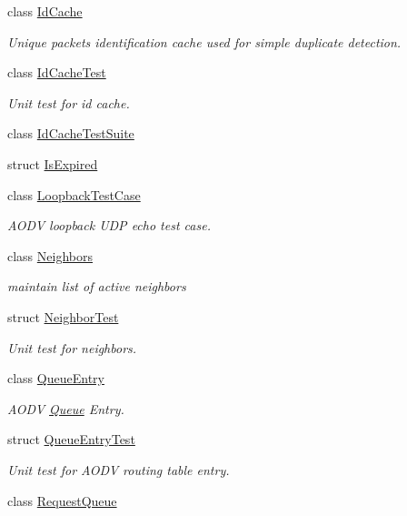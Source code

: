 \begin{DoxyCompactItemize}
class \hyperlink{classns3_1_1aodv_1_1IdCache}{Id\+Cache}
\begin{DoxyCompactList}\small\item\em Unique packets identification cache used for simple duplicate detection. \end{DoxyCompactList}\item 
class \hyperlink{classns3_1_1aodv_1_1IdCacheTest}{Id\+Cache\+Test}
\begin{DoxyCompactList}\small\item\em Unit test for id cache. \end{DoxyCompactList}\item 
class \hyperlink{classns3_1_1aodv_1_1IdCacheTestSuite}{Id\+Cache\+Test\+Suite}
\item 
struct \hyperlink{structns3_1_1aodv_1_1IsExpired}{Is\+Expired}
\item 
class \hyperlink{classns3_1_1aodv_1_1LoopbackTestCase}{Loopback\+Test\+Case}
\begin{DoxyCompactList}\small\item\em A\+O\+DV loopback U\+DP echo test case. \end{DoxyCompactList}\item 
class \hyperlink{classns3_1_1aodv_1_1Neighbors}{Neighbors}
\begin{DoxyCompactList}\small\item\em maintain list of active neighbors \end{DoxyCompactList}\item 
struct \hyperlink{structns3_1_1aodv_1_1NeighborTest}{Neighbor\+Test}
\begin{DoxyCompactList}\small\item\em Unit test for neighbors. \end{DoxyCompactList}\item 
class \hyperlink{classns3_1_1aodv_1_1QueueEntry}{Queue\+Entry}
\begin{DoxyCompactList}\small\item\em A\+O\+DV \hyperlink{classns3_1_1Queue}{Queue} Entry. \end{DoxyCompactList}\item 
struct \hyperlink{structns3_1_1aodv_1_1QueueEntryTest}{Queue\+Entry\+Test}
\begin{DoxyCompactList}\small\item\em Unit test for A\+O\+DV routing table entry. \end{DoxyCompactList}\item 
class \hyperlink{classns3_1_1aodv_1_1RequestQueue}{Request\+Queue}

\end{DoxyCompactItemize}
